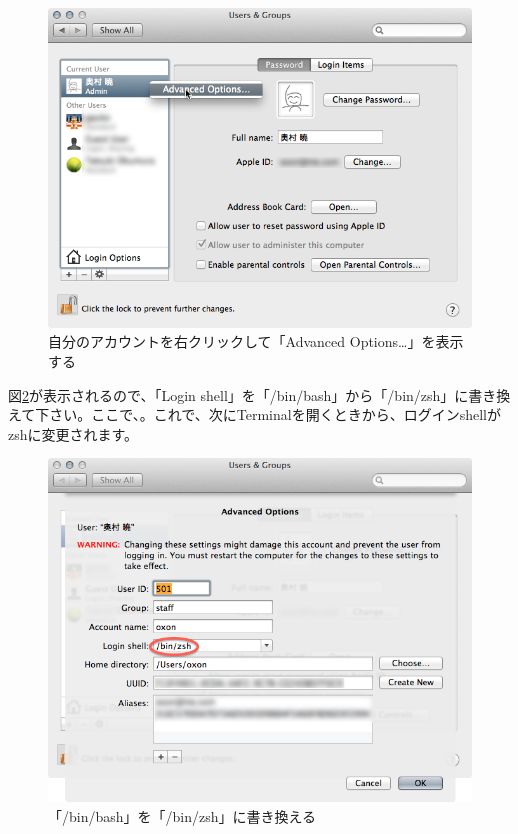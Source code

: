 \begin{figure}
  \centering
  \includegraphics[scale=0.35]{fig/zsh1.png}
  \caption{自分のアカウントを右クリックして「Advanced Options\ldots」を表示する}
  \label{fig:zsh1_png}
\end{figure}

図\ref{fig:zsh2_png}が表示されるので、「Login shell」を「/bin/bash」から「/bin/zsh」に書き換えて下さい。ここで、{\bf{}}。これで、次にTerminalを開くときから、ログインshellがzshに変更されます。

\begin{figure}
  \centering
  \includegraphics[scale=0.35]{fig/zsh2.png}
  \caption{「/bin/bash」を「/bin/zsh」に書き換える}
  \label{fig:zsh2_png}
\end{figure}

